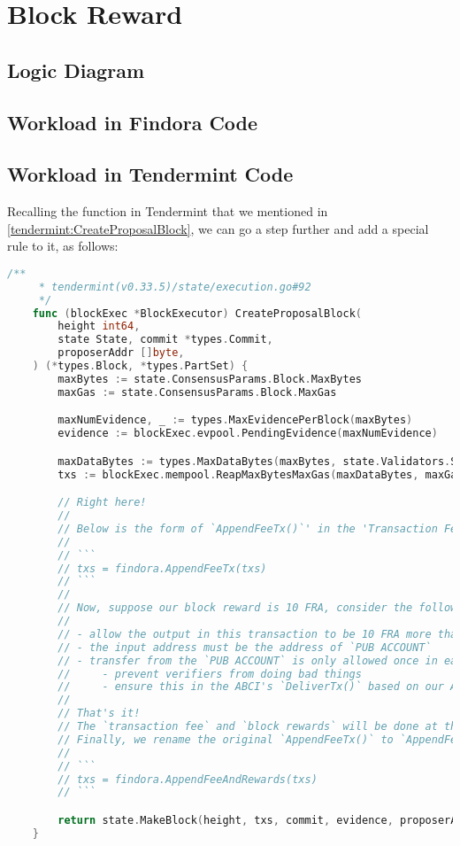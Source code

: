 \section{Block Reward}

\subsection{Logic Diagram}

\subsection{Workload in Findora Code}

\subsection{Workload in Tendermint Code}

Recalling the  function in Tendermint that we mentioned in \ref{tendermint:CreateProposalBlock},
we can go a step further and add a special rule to it, as follows:

\begin{lstlisting}[language=go]
    /**
     * tendermint(v0.33.5)/state/execution.go#92
     */
    func (blockExec *BlockExecutor) CreateProposalBlock(
        height int64,
        state State, commit *types.Commit,
        proposerAddr []byte,
    ) (*types.Block, *types.PartSet) {
        maxBytes := state.ConsensusParams.Block.MaxBytes
        maxGas := state.ConsensusParams.Block.MaxGas

        maxNumEvidence, _ := types.MaxEvidencePerBlock(maxBytes)
        evidence := blockExec.evpool.PendingEvidence(maxNumEvidence)

        maxDataBytes := types.MaxDataBytes(maxBytes, state.Validators.Size(), len(evidence))
        txs := blockExec.mempool.ReapMaxBytesMaxGas(maxDataBytes, maxGas)

        // Right here!
        //
        // Below is the form of `AppendFeeTx()`' in the 'Transaction Fee' section:
        //
        // ```
        // txs = findora.AppendFeeTx(txs)
        // ```
        //
        // Now, suppose our block reward is 10 FRA, consider the following rules:
        //
        // - allow the output in this transaction to be 10 FRA more than the input
        // - the input address must be the address of `PUB ACCOUNT`
        // - transfer from the `PUB ACCOUNT` is only allowed once in each block
        //     - prevent verifiers from doing bad things
        //     - ensure this in the ABCI's `DeliverTx()` based on our APP logic
        //
        // That's it!
        // The `transaction fee` and `block rewards` will be done at the same time.
        // Finally, we rename the original `AppendFeeTx()` to `AppendFeeAndRewards()`:
        //
        // ```
        // txs = findora.AppendFeeAndRewards(txs)
        // ```

        return state.MakeBlock(height, txs, commit, evidence, proposerAddr)
    }
\end{lstlisting}
